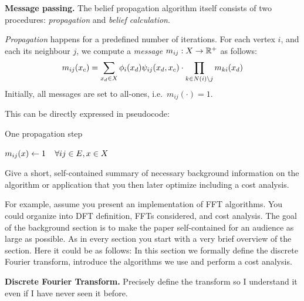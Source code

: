 \documentclass[letterpaper]{article}
\newcommand{\mypar}[1]{{\bf #1.}}
\begin{document}
\mypar{Message passing} The belief propagation algorithm itself consists of two
procedures: \emph{propagation} and \emph{belief calculation}.

\emph{Propagation} happens for a predefined number of iterations. For each vertex $i$, and each its neighbour $j$, we compute a \emph{message} $m_{ij} : X \to \mathbb{R}^+$ as follows:
%
$$m_{ij}(x_c) = \sum_{x_d \in X} \phi_i(x_d)\psi_{ij}(x_d, x_c) \cdot \prod_{k \in N(i) \setminus j} m_{ki}(x_d)$$
%
Initially, all messages are set to all-ones, i.e.~$m_{ij}(\cdot) = 1$.

This can be directly expressed in pseudocode:

\def\lineAlgoPropagateForI{4}
\def\lineAlgoPropagateCalcProduct{9}
\begin{algorithm}
\caption{One propagation step}
\label{algo:propagate}
\algodefaults
	$m_{ij}(x) \leftarrow 1\mkern 20mu\forall ij \in E, x \in X$\;
\end{algorithm}



Give a short, self-contained summary of necessary
background information on the algorithm or application that you then later optimize including a cost analysis.

For example, assume you present an
implementation of FFT algorithms. You could organize into DFT
definition, FFTs considered, and cost analysis. The goal of the
background section is to make the paper self-contained for an audience
as large as possible. As in every section
you start with a very brief overview of the section. Here it could be as follows: In this section
we formally define the discrete Fourier transform, introduce the algorithms we use
and perform a cost analysis.

\mypar{Discrete Fourier Transform}
Precisely define the transform so I understand it even if I have never
seen it before.
\end{document}
